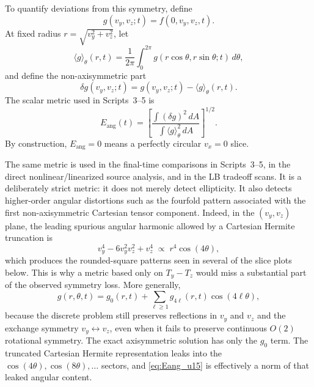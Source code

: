 \documentclass[11pt]{article}
\begin{document}
To quantify deviations from this symmetry, define
\begin{equation}
g(v_y,v_z;t)=f(0,v_y,v_z,t).
\end{equation}
At fixed radius $r=\sqrt{v_y^2+v_z^2}$, let
\begin{equation}
\langle g\rangle_\theta(r,t)=\frac{1}{2\pi}\int_0^{2\pi}g(r\cos\theta,r\sin\theta;t)\,d\theta,
\end{equation}
and define the non-axisymmetric part
\begin{equation}
\delta g(v_y,v_z;t)=g(v_y,v_z;t)-\langle g\rangle_\theta(r,t).
\end{equation}
The scalar metric used in Scripts~3--5 is
\begin{equation}
E_{\mathrm{ang}}(t)=
\left[
\frac{\int (\delta g)^2\,dA}{\int \langle g\rangle_\theta^2\,dA}
\right]^{1/2}.
\label{eq:Eang_u15}
\end{equation}
By construction, $E_{\mathrm{ang}}=0$ means a perfectly circular $v_x=0$ slice.

The same metric is used in the final-time comparisons in Scripts~3--5, in the direct nonlinear/linearized source analysis, and in the LB tradeoff scans.
It is a deliberately strict metric: it does not merely detect ellipticity.
It also detects higher-order angular distortions such as the fourfold pattern associated with the first non-axisymmetric Cartesian tensor component.
Indeed, in the $(v_y,v_z)$ plane, the leading spurious angular harmonic allowed by a Cartesian Hermite truncation is
\begin{equation}
v_y^4 - 6v_y^2v_z^2 + v_z^4 \;\propto\; r^4 \cos(4\theta),
\label{eq:cos4theta_u15}
\end{equation}
which produces the rounded-square patterns seen in several of the slice plots below.
This is why a metric based only on $T_y-T_z$ would miss a substantial part of the observed symmetry loss.
More generally,
\begin{equation}
g(r,\theta,t)=g_0(r,t)+\sum_{\ell\ge 1} g_{4\ell}(r,t)\cos(4\ell\theta),
\label{eq:angular_modes_u15}
\end{equation}
because the discrete problem still preserves reflections in $v_y$ and $v_z$ and the exchange symmetry $v_y\leftrightarrow v_z$, even when it fails to preserve continuous $O(2)$ rotational symmetry.
The exact axisymmetric solution has only the $g_0$ term.
The truncated Cartesian Hermite representation leaks into the $\cos(4\theta),\cos(8\theta),\ldots$ sectors, and \cref{eq:Eang_u15} is effectively a norm of that leaked angular content.
\end{document}

